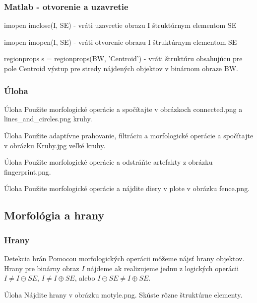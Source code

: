 \documentclass{beamer}
\begin{document}
\begin{frame}
\frametitle{Matlab - otvorenie a uzavretie}
  \begin{block}{imopen}
  imclose(I, SE) - vráti uzavretie obrazu I štruktúrnym elementom SE
  \end{block}
  
  \begin{block}{imopen}
  imopen(I, SE) - vráti otvorenie obrazu I štruktúrnym elementom SE
  \end{block}  
  
  \begin{block}{regionprops}
  s = regionprops(BW, 'Centroid') - vráti štruktúru obsahujúcu pre pole Centroid výstup pre stredy nájdených objektov v binárnom obraze BW.
  \end{block} 
\end{frame}

\begin{frame}
\frametitle{Úloha}
  \begin{block}{Úloha}
  Použite morfologické operácie a spočítajte v obrázkoch connected.png a lines\_and\_circles.png kruhy.
  \end{block}  
  
  \begin{block}{Úloha}
  Použite adaptívne prahovanie, filtráciu a morfologické operácie a spočítajte v obrázku Kruhy.jpg veľké kruhy.
  \end{block}  
  
  \begin{block}{Úloha}
  Použite morfologické operácie a odstráňte artefakty z obrázku fingerprint.png.
  \end{block}
  
  \begin{block}{Úloha}
  Použite morfologické operácie a nájdite diery v plote v obrázku fence.png.
  \end{block}
\end{frame}


\subsection{Morfológia a hrany}

\begin{frame}
\frametitle{Hrany}
  \begin{block}{Detekcia hrán}
  Pomocou morfologických operácii môžeme nájsť hrany objektov. Hrany pre binárny obraz $I$ nájdeme ak realizujeme jednu z logických operácii $I \neq I \ominus SE$, $I \neq I \oplus SE$, alebo $I \ominus SE \neq I \oplus SE$.
  \end{block}    
  
  \begin{block}{Úloha}
  Nájdite hrany v obrázku motyle.png. Skúste rôzne štruktúrne elementy.
  \end{block}    
\end{frame}
\end{document}
